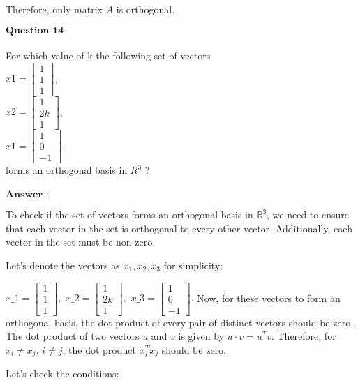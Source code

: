 \documentclass[11pt]{article}
\begin{document}
Therefore, only matrix $A$ is orthogonal.

    $\textbf{Question 14}$\\
~\\
For which value of k the following set of vectors\\
$x1=\begin{bmatrix} 1 \\ 1 \\ 1 \end{bmatrix}$,\\
$x2=\begin{bmatrix} 1 \\ 2k \\ 1 \end{bmatrix}$,\\
$x1=\begin{bmatrix} 1 \\ 0 \\ -1 \end{bmatrix}$,\\
forms an orthogonal basis in $R^3$ ?\\
~\\
$\textbf{Answer :}$

    To check if the set of vectors forms an orthogonal basis in
$\mathbb{R}^3$, we need to ensure that each vector in the set is
orthogonal to every other vector. Additionally, each vector in the set
must be non-zero.

Let's denote the vectors as $x_1, x_2, x_3$ for simplicity:

$ x\_1 =
\begin{bmatrix} 1 \\ 1 \\ 1 \end{bmatrix}
, $ $ x\_2 =
\begin{bmatrix} 1 \\ 2k \\ 1 \end{bmatrix}
, $ $ x\_3 =
\begin{bmatrix} 1 \\ 0 \\ -1 \end{bmatrix}
. $
Now, for these vectors to form an orthogonal basis, the dot product of
every pair of distinct vectors should be zero. The dot product of two
vectors $u$ and $v$ is given by $u \cdot v = u^Tv$. Therefore, for
$x_i \neq x_j$, $i \neq j$, the dot product $x_i^Tx_j$ should be
zero.

Let's check the conditions:
\end{document}
